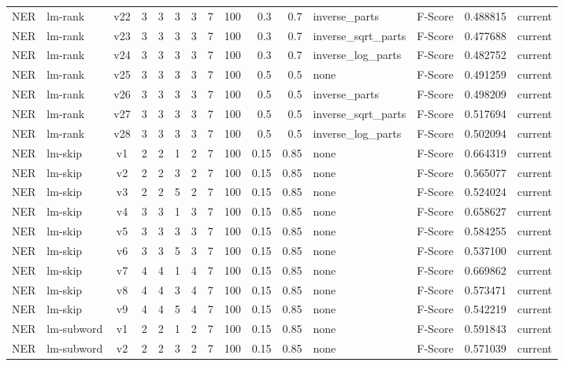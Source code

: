 \documentclass{article}
\begin{document}
\begin{xltabular}{\linewidth}{@{}lYcrrrrrrrrYlrl@{}}
NER & lm-rank & v22 & 3 & 3 & 3 & 3 & 7 & 100 & 0.3 & 0.7 & inverse\_parts & F-Score & 0.488815 & current \\
NER & lm-rank & v23 & 3 & 3 & 3 & 3 & 7 & 100 & 0.3 & 0.7 & inverse\_sqrt\_parts & F-Score & 0.477688 & current \\
NER & lm-rank & v24 & 3 & 3 & 3 & 3 & 7 & 100 & 0.3 & 0.7 & inverse\_log\_parts & F-Score & 0.482752 & current \\
NER & lm-rank & v25 & 3 & 3 & 3 & 3 & 7 & 100 & 0.5 & 0.5 & none & F-Score & 0.491259 & current \\
NER & lm-rank & v26 & 3 & 3 & 3 & 3 & 7 & 100 & 0.5 & 0.5 & inverse\_parts & F-Score & 0.498209 & current \\
NER & lm-rank & v27 & 3 & 3 & 3 & 3 & 7 & 100 & 0.5 & 0.5 & inverse\_sqrt\_parts & F-Score & 0.517694 & current \\
NER & lm-rank & v28 & 3 & 3 & 3 & 3 & 7 & 100 & 0.5 & 0.5 & inverse\_log\_parts & F-Score & 0.502094 & current \\
NER & lm-skip & v1 & 2 & 2 & 1 & 2 & 7 & 100 & 0.15 & 0.85 & none & F-Score & 0.664319 & current \\
NER & lm-skip & v2 & 2 & 2 & 3 & 2 & 7 & 100 & 0.15 & 0.85 & none & F-Score & 0.565077 & current \\
NER & lm-skip & v3 & 2 & 2 & 5 & 2 & 7 & 100 & 0.15 & 0.85 & none & F-Score & 0.524024 & current \\
NER & lm-skip & v4 & 3 & 3 & 1 & 3 & 7 & 100 & 0.15 & 0.85 & none & F-Score & 0.658627 & current \\
NER & lm-skip & v5 & 3 & 3 & 3 & 3 & 7 & 100 & 0.15 & 0.85 & none & F-Score & 0.584255 & current \\
NER & lm-skip & v6 & 3 & 3 & 5 & 3 & 7 & 100 & 0.15 & 0.85 & none & F-Score & 0.537100 & current \\
NER & lm-skip & v7 & 4 & 4 & 1 & 4 & 7 & 100 & 0.15 & 0.85 & none & F-Score & 0.669862 & current \\
NER & lm-skip & v8 & 4 & 4 & 3 & 4 & 7 & 100 & 0.15 & 0.85 & none & F-Score & 0.573471 & current \\
NER & lm-skip & v9 & 4 & 4 & 5 & 4 & 7 & 100 & 0.15 & 0.85 & none & F-Score & 0.542219 & current \\
NER & lm-subword & v1 & 2 & 2 & 1 & 2 & 7 & 100 & 0.15 & 0.85 & none & F-Score & 0.591843 & current \\
NER & lm-subword & v2 & 2 & 2 & 3 & 2 & 7 & 100 & 0.15 & 0.85 & none & F-Score & 0.571039 & current \\

\end{xltabular}
\end{document}
